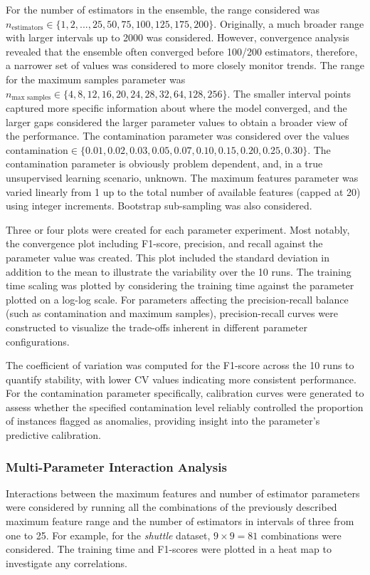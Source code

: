 \documentclass[10pt, conference]{IEEEtran}
\begin{document}
For the number of estimators in the ensemble, the range considered was $n_\text{estimators} \in \{1,2,...,25,50,75,100,125,175,200\}$. Originally, a much broader range with larger intervals up to 2000 was considered. However, convergence analysis revealed that the ensemble often converged before 100/200 estimators, therefore, a narrower set of values was considered to more closely monitor trends. The range for the maximum samples parameter was $n_\text{max samples} \in \{4,8,12,16,20,24,28,32,64,128,256\}$. The smaller interval points captured more specific information about where the model converged, and the larger gaps considered the larger parameter values to obtain a broader view of the performance. The contamination parameter was considered over the values $\text{contamination} \in \{0.01, 0.02, 0.03, 0.05, 0.07, 0.10, 0.15, 0.20, 0.25, 0.30\}$. The contamination parameter is obviously problem dependent, and, in a true unsupervised learning scenario, unknown. The maximum features parameter was varied linearly from 1 up to the total number of available features (capped at 20) using integer increments. Bootstrap sub-sampling was also considered.

Three or four plots were created for each parameter experiment. Most notably, the convergence plot including F1-score, precision, and recall against the parameter value was created. This plot included the standard deviation in addition to the mean to illustrate the variability over the 10 runs. The training time scaling was plotted by considering the training time against the parameter plotted on a log-log scale. For parameters affecting the precision-recall balance (such as contamination and maximum samples), precision-recall curves were constructed to visualize the trade-offs inherent in different parameter configurations.

The coefficient of variation was computed for the F1-score across the 10 runs to quantify stability, with lower CV values indicating more consistent performance. For the contamination parameter specifically, calibration curves were generated to assess whether the specified contamination level reliably controlled the proportion of instances flagged as anomalies, providing insight into the parameter's predictive calibration.

\subsubsection{Multi-Parameter Interaction Analysis}
Interactions between the maximum features and number of estimator parameters were considered by running all the combinations of the previously described maximum feature range and the number of estimators in intervals of three from one to 25. For example, for the \textit{shuttle} dataset, $9 \times 9 = 81$ combinations were considered. The training time and F1-scores were plotted in a heat map to investigate any correlations.
\end{document}
